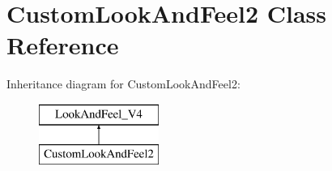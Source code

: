 \hypertarget{class_custom_look_and_feel2}{}\section{Custom\+Look\+And\+Feel2 Class Reference}
\label{class_custom_look_and_feel2}
Inheritance diagram for Custom\+Look\+And\+Feel2\+:\begin{figure}[H]
\begin{center}
\leavevmode
\includegraphics[height=2.000000cm]{class_custom_look_and_feel2}
\end{center}
\end{figure}
